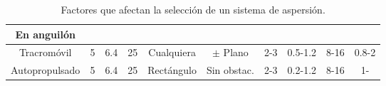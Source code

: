 \begin{table}[h!]
\begin{turn}{90}
\begin{tabular}{c|c|c|c|c|c|c|c|c|c}
			\multicolumn{1}{|c|}{\textbf{En anguilón}}                                       & \multicolumn{1}{|c|}{}                                                                    & \multicolumn{1}{|c|}{}                                                                 & \multicolumn{1}{|c|}{}   & \multicolumn{1}{c|}{}                                                            & \multicolumn{1}{c|}{}                                                               & \multicolumn{1}{|c|}{}                                                                 & \multicolumn{1}{|c|}{}                                                             & \multicolumn{1}{|c|}{}                                                            & \multicolumn{1}{|c|}{}                                                                    \\ \midrule
			\multicolumn{1}{|c|}{Tracromóvil}                                                & \multicolumn{1}{|c|}{5}                                                                   & \multicolumn{1}{|c|}{6.4}                                                              & \multicolumn{1}{|c|}{25} & \multicolumn{1}{c|}{Cualquiera}                                                  & \multicolumn{1}{c|}{$\pm$ Plano}                                                    & \multicolumn{1}{c|}{2-3}                                                               & \multicolumn{1}{|c|}{0.5-1.2}                                                      & \multicolumn{1}{|c|}{8-16}                                                        & \multicolumn{1}{|c|}{0.8-2}                                                               \\ \midrule
			\multicolumn{1}{|c|}{Autopropulsado}                                             & \multicolumn{1}{|c|}{5}                                                                   & \multicolumn{1}{|c|}{6.4}                                                              & \multicolumn{1}{|c|}{25} & \multicolumn{1}{c|}{Rectángulo}                                                  & \multicolumn{1}{c|}{Sin obstac.}                                                    & \multicolumn{1}{c|}{2-3}                                                               & \multicolumn{1}{c|}{0.2-1.2}                                                       & \multicolumn{1}{c|}{8-16}                                                         & \multicolumn{1}{c|}{1-}                                                                   \\ \midrule
		\end{tabular}
	\end{turn}
	\caption{Factores que afectan la selección de un sistema de aspersión.}
	\label{tab19}
\end{table}

